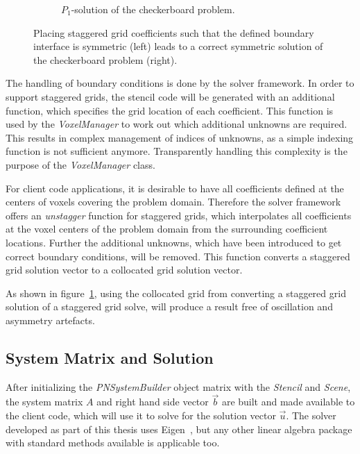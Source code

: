 \begin{figure}[h]
\begin{subfigure}[t]{0.34\columnwidth}
\caption{$P_1$-solution of the checkerboard problem.}
\label{fig:pn_staggering_correct_bc_checkerboard}
\end{subfigure}
\caption{Placing staggered grid coefficients such that the defined boundary interface is symmetric (left) leads to a correct symmetric solution of the checkerboard problem (right).}
\label{fig:pn_staggered_grid_handled_bc}
\end{figure}

The handling of boundary conditions is done by the solver framework. In order to support staggered grids, the stencil code will be generated with an additional function, which specifies the grid location of each coefficient. This function is used by the \emph{VoxelManager} to work out which additional unknowns are required. This results in complex management of indices of unknowns, as a simple indexing function is not sufficient anymore. Transparently handling this complexity is the purpose of the \emph{VoxelManager} class.

For client code applications, it is desirable to have all coefficients defined at the centers of voxels covering the problem domain. Therefore the solver framework offers an \emph{unstagger} function for staggered grids, which interpolates all coefficients at the voxel centers of the problem domain from the surrounding coefficient locations. Further the additional unknowns, which have been introduced to get correct boundary conditions, will be removed. This function converts a staggered grid solution vector to a collocated grid solution vector.

As shown in figure~\ref{fig:pn_staggering_correct_bc_checkerboard}, using the collocated grid from converting a staggered grid solution of a staggered grid solve, will produce a result free of oscillation and asymmetry artefacts.

\subsection{System Matrix and Solution}
\label{sec:pn_system_matrix}

After initializing the \emph{PNSystemBuilder} object matrix with the \emph{Stencil} and \emph{Scene}, the system matrix $A$ and right hand side vector $\vec{b}$ are built and made available to the client code, which will use it to solve for the solution vector $\vec{u}$. The solver developed as part of this thesis uses Eigen~\cite{Eigen}, but any other linear algebra package with standard methods available is applicable too. 

